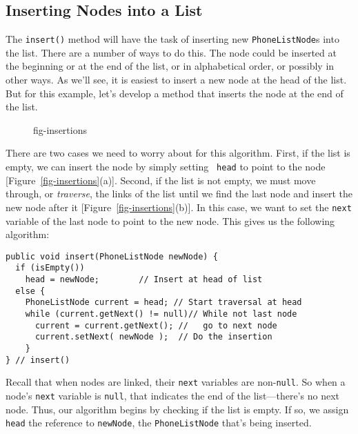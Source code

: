 \subsection*{Inserting Nodes into a List}

\noindent The {\tt insert()} method will have the task of inserting new
{\tt Phone\-List\-Node}s into the list.  There are a number of ways to do
this.  The node could be inserted at the beginning or at
the end of the list, or in alphabetical order, or possibly in other
ways.  As we'll see, it is easiest to insert a new node at the
head of the list.   But for this example, let's develop a method that
inserts the node at the end  of the list.

\begin{figure}[tb]
 {fig-insertions}
\end{figure}

There are two cases we need to worry about for this algorithm.   First,
if the list is empty, we can insert the node by simply setting {\tt
head} to point to the node [Figure~\ref{fig-insertions}(a)].  Second,
if the list is not empty, we must move through, or {\em
traverse}, the links of the list until we find the
last node and insert the new node after it
[Figure~\ref{fig-insertions}(b)]. In this case, we want to set the
{\tt next} variable of the last node to point to the new node.  This
gives us the following algorithm:

\begin{jjjlisting}
\begin{lstlisting}
public void insert(PhoneListNode newNode) {
  if (isEmpty())
    head = newNode;        // Insert at head of list
  else {
    PhoneListNode current = head; // Start traversal at head
    while (current.getNext() != null)// While not last node
      current = current.getNext(); //   go to next node
      current.setNext( newNode );  // Do the insertion
    }
} // insert()
\end{lstlisting}
\end{jjjlisting}

\noindent Recall that when nodes are linked, their {\tt next}
variables are non-{\tt null}. So when a node's {\tt next} variable is
{\tt null}, that indicates the end of the list---there's no next
node.   Thus, our algorithm begins by checking if the list is empty.  If
so, we assign {\tt head} the reference to {\tt newNode}, the
{\tt PhoneListNode} that's being inserted.

